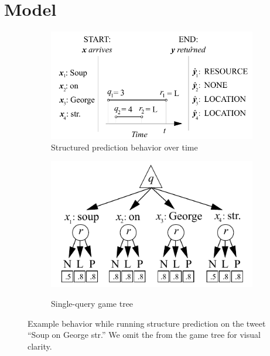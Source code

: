 \section{Model}
\label{sec:model}

\begin{figure}
  \begin{centering}
    \begin{subfigure}[b]{0.58\textwidth}
      \includegraphics[width=\textwidth]{figures/piano-roll.pdf}
      \caption{Structured prediction behavior over time}
    \end{subfigure}
    \hfill
    \begin{subfigure}[b]{0.38\textwidth}
      \includegraphics[width=\textwidth,height=0.23\textheight,keepaspectratio]{figures/single-move.pdf}\\[1.7ex]
      \caption{Single-query game tree}
    \end{subfigure}
  \end{centering}
\caption{Example behavior while running structure prediction on the tweet ``Soup on George str.''
We omit the \scres{} from the game tree for visual clarity.
}
\label{fig:game-tree}
\end{figure}

